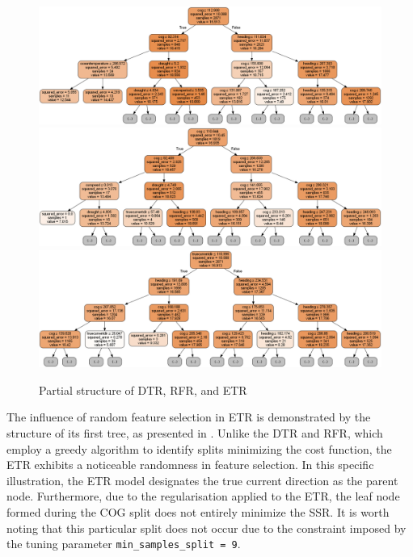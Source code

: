 
\begin{figure}
    \centering
    \includegraphics[width=.9\textwidth]{02_figures/dtr_mod_1tree.png}\\
    \includegraphics[width=.9\textwidth]{02_figures/rfr_mod_it1.png}\\
    \includegraphics[width=.9\textwidth]{02_figures/etr_mod_it1.png}
    \caption{Partial structure of DTR, RFR, and ETR}
    \label{fig:overall_tree_partial_structure}
\end{figure}

The influence of random feature selection in ETR is demonstrated by the structure of its first tree, as presented in . Unlike the DTR and RFR, which employ a greedy algorithm to identify splits minimizing the cost function, the ETR exhibits a noticeable randomness in feature selection. In this specific illustration, the ETR model designates the true current direction as the parent node. Furthermore, due to the regularisation applied to the ETR, the leaf node formed during the COG split does not entirely minimize the SSR. It is worth noting that this particular split does not occur due to the constraint imposed by the tuning parameter {\tt min\_samples\_split = 9}.\\

